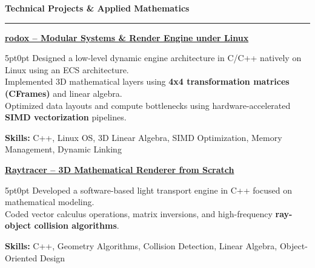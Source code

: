 \documentclass[9pt]{extarticle}
\begin{document}
\par\vspace{5pt}

{\large\bfseries Technical Projects \& Applied Mathematics}
\par\vspace{-8pt}
\rule{\linewidth}{0.4pt}
\par\vspace{5pt}

\underline{\bfseries rodox -- Modular Systems \& Render Engine under Linux}
\par
\begin{adjustwidth}{5pt}{0pt}
    Designed a low-level dynamic engine architecture in C/C++ natively on Linux using an ECS architecture. \\
    Implemented 3D mathematical layers using {\bfseries 4x4 transformation matrices (CFrames)} and linear algebra. \\
    Optimized data layouts and compute bottlenecks using hardware-accelerated {\bfseries SIMD vectorization} pipelines.
\end{adjustwidth}
\par
{\bfseries Skills:} C++, Linux OS, 3D Linear Algebra, SIMD Optimization, Memory Management, Dynamic Linking

\par\vspace{8pt}

\underline{\bfseries Raytracer -- 3D Mathematical Renderer from Scratch}
\par
\begin{adjustwidth}{5pt}{0pt}
    Developed a software-based light transport engine in C++ focused on mathematical modeling. \\
    Coded vector calculus operations, matrix inversions, and high-frequency {\bfseries ray-object collision algorithms}.
\end{adjustwidth}
\par
{\bfseries Skills:} C++, Geometry Algorithms, Collision Detection, Linear Algebra, Object-Oriented Design

\par\vspace{8pt}
\end{document}
